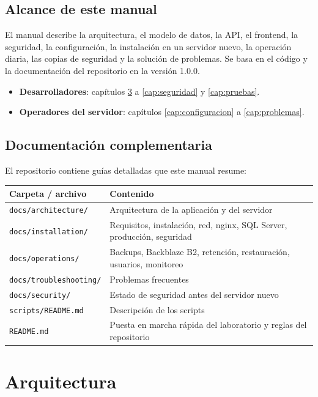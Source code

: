 \documentclass[11pt,a4paper,oneside]{report}
\DeclareRobustCommand{\ruta}[1]{{\small\nolinkurl{#1}}}
\newcommand{\cabecera}{\rowcolor{utaRojo!12}}
\begin{document}
\section{Alcance de este manual}
El manual describe la arquitectura, el modelo de datos, la API, el frontend, la seguridad,
la configuración, la instalación en un servidor nuevo, la operación diaria, las copias de
seguridad y la solución de problemas. Se basa en el código y la documentación del
repositorio en la versión 1.0.0.

\begin{itemize}
  \item \textbf{Desarrolladores}: capítulos \ref{cap:arquitectura} a \ref{cap:seguridad} y \ref{cap:pruebas}.
  \item \textbf{Operadores del servidor}: capítulos \ref{cap:configuracion} a \ref{cap:problemas}.
\end{itemize}

\section{Documentación complementaria}
El repositorio contiene guías detalladas que este manual resume:

\begin{center}
\begin{tabularx}{\linewidth}{@{}P{6.3cm}L@{}}
\toprule
\cabecera \textbf{Carpeta / archivo} & \textbf{Contenido} \\
\midrule
\ruta{docs/architecture/} & Arquitectura de la aplicación y del servidor \\
\ruta{docs/installation/} & Requisitos, instalación, red, nginx, SQL Server, producción, seguridad \\
\ruta{docs/operations/} & Backups, Backblaze B2, retención, restauración, usuarios, monitoreo \\
\ruta{docs/troubleshooting/} & Problemas frecuentes \\
\ruta{docs/security/} & Estado de seguridad antes del servidor nuevo \\
\ruta{scripts/README.md} & Descripción de los scripts \\
\ruta{README.md} & Puesta en marcha rápida del laboratorio y reglas del repositorio \\
\bottomrule
\end{tabularx}
\end{center}

\chapter{Arquitectura}\label{cap:arquitectura}
\end{document}
